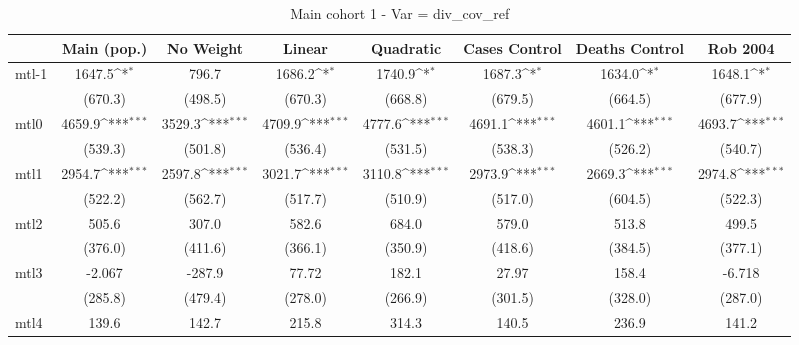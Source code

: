 \documentclass{article}
\begin{document}
{
\def\sym#1{\ifmmode^{#1}\else\(^{#1}\)\fi}
\begin{longtable}{l*{7}{c}}
\caption{Main cohort 1 - Var = div\_cov\_ref}\\
\hline\hline\endfirsthead\hline\endhead\hline\endfoot\endlastfoot
                &\multicolumn{1}{c}{Main (pop.)}&\multicolumn{1}{c}{No Weight}&\multicolumn{1}{c}{Linear}&\multicolumn{1}{c}{Quadratic}&\multicolumn{1}{c}{Cases Control}&\multicolumn{1}{c}{Deaths Control}&\multicolumn{1}{c}{Rob 2004}\\
\hline
mtl-1           &   1647.5\sym{*}  &    796.7         &   1686.2\sym{*}  &   1740.9\sym{*}  &   1687.3\sym{*}  &   1634.0\sym{*}  &   1648.1\sym{*}  \\
                &  (670.3)         &  (498.5)         &  (670.3)         &  (668.8)         &  (679.5)         &  (664.5)         &  (677.9)         \\
mtl0            &   4659.9\sym{***}&   3529.3\sym{***}&   4709.9\sym{***}&   4777.6\sym{***}&   4691.1\sym{***}&   4601.1\sym{***}&   4693.7\sym{***}\\
                &  (539.3)         &  (501.8)         &  (536.4)         &  (531.5)         &  (538.3)         &  (526.2)         &  (540.7)         \\
mtl1            &   2954.7\sym{***}&   2597.8\sym{***}&   3021.7\sym{***}&   3110.8\sym{***}&   2973.9\sym{***}&   2669.3\sym{***}&   2974.8\sym{***}\\
                &  (522.2)         &  (562.7)         &  (517.7)         &  (510.9)         &  (517.0)         &  (604.5)         &  (522.3)         \\
mtl2            &    505.6         &    307.0         &    582.6         &    684.0         &    579.0         &    513.8         &    499.5         \\
                &  (376.0)         &  (411.6)         &  (366.1)         &  (350.9)         &  (418.6)         &  (384.5)         &  (377.1)         \\
mtl3            &   -2.067         &   -287.9         &    77.72         &    182.1         &    27.97         &    158.4         &   -6.718         \\
                &  (285.8)         &  (479.4)         &  (278.0)         &  (266.9)         &  (301.5)         &  (328.0)         &  (287.0)         \\
mtl4            &    139.6         &    142.7         &    215.8         &    314.3         &    140.5         &    236.9         &    141.2         \\

\end{longtable}}
\end{document}
